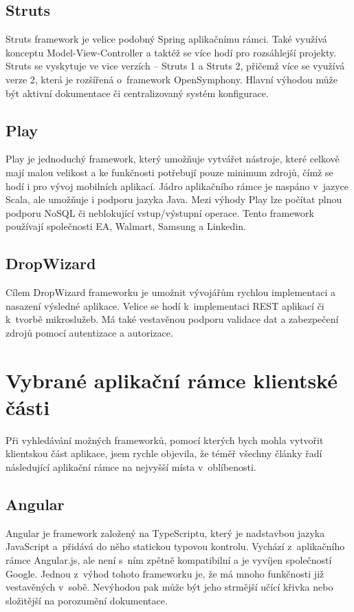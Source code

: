 \subsection{Struts}

Struts framework je velice podobný Spring aplikačnímu rámci. Také využívá konceptu Model-View-Controller a taktéž se více hodí pro rozsáhlejší projekty. Struts se vyskytuje ve vice verzích – Struts 1 a Struts 2, přičemž více se využívá verze 2, která je rozšířená o~framework OpenSymphony. Hlavní výhodou může být aktivní dokumentace či centralizovaný systém konfigurace.

\subsection{Play}

Play je jednoduchý framework, který umožňuje vytvářet nástroje, které celkově mají malou velikost a ke funkčnosti potřebují pouze minimum zdrojů, čímž se hodí i pro vývoj mobilních aplikací. Jádro aplikačního rámce je naspáno v~jazyce Scala, ale umožňuje i podporu jazyka Java. Mezi výhody Play lze počítat plnou podporu NoSQL či neblokující vstup/výstupní operace. Tento framework používají společnosti EA, Walmart, Samsung a Linkedin.

\subsection{DropWizard}

Cílem DropWizard frameworku je umožnit vývojářům rychlou implementaci a nasazení výsledné aplikace. Velice se hodí k~implementaci REST aplikací či k~tvorbě mikroslužeb. Má také vestavěnou podporu validace dat a zabezpečení zdrojů pomocí autentizace a autorizace.

\section{Vybrané aplikační rámce klientské části}

Při vyhledávání možných frameworků, pomocí kterých bych mohla vytvořit klientskou část aplikace, jsem rychle objevila, že téměř všechny články řadí následující aplikační rámce na nejvyšší místa v~oblíbenosti.

\subsection{Angular}

Angular je framework založený na TypeScriptu, který je nadstavbou jazyka JavaScript a~přidává do něho statickou typovou kontrolu. Vychází z~aplikačního rámce Angular.js, ale není s~ním zpětně kompatibilní a je vyvíjen společností Google. Jednou z~výhod tohoto frameworku je, že má mnoho funkčnosti již vestavěných v~sobě. Nevýhodou pak může být jeho strmější učící křivka nebo složitější na porozumění dokumentace.

